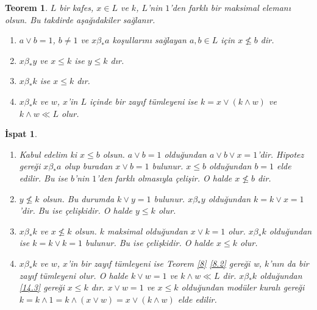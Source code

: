 \documentclass[a4paper,12pt]{article}
\numberwithin{equation}{section}
\theoremstyle{italik}
\newtheorem{teorem}{Teorem}[section]
\newtheorem*{ispat}{İspat}
\begin{document}
\begin{teorem}\label{14}
  $ L $ bir kafes, $ x \in L $ ve $ k $, $ L $'nin $ 1 $'den farklı bir maksimal elemanı olsun. Bu takdirde aşağıdakiler 
  sağlanır. 
  \begin{enumerate}[label=(\roman{*}), ref=(\roman{*})]
    \item $ a \vee b = 1 $, $ b \neq 1 $ ve $ x \beta_* a $ koşullarını sağlayan $ a,b \in L $ için $ x \not\le b $ dir.\label{14.1}
    \item $ x \beta_* y $ ve $ x \leq k $ ise $ y \leq k $ dır.\label{14.2}
    \item $ x \beta_* k $ ise $ x \leq k $ dır.\label{14.3}
    \item $ x \beta_* k $ ve $ w $, $ x $'in $ L $ içinde bir zayıf tümleyeni ise $ k = x \vee ( k \wedge w ) $ 
      ve $ k \wedge w \ll L $ olur.\label{14.4}
  \end{enumerate}
\end{teorem}
\begin{ispat}
  \begin{enumerate}
    \item 
      Kabul edelim ki $ x \leq b $ olsun. $ a \vee b = 1 $ olduğundan $ a \vee b \vee x = 1 $'dir. 
      Hipotez gereği $ x \beta_* a $ olup buradan $ x \vee b = 1 $ bulunur. $ x \leq b $ olduğundan 
      $ b = 1 $ elde edilir. Bu ise $ b $'nin $ 1 $'den farklı olmasıyla çelişir. O halde $ x \not\le b $ dir.
    \item 
      $ y \not\le k $ olsun. Bu durumda $ k \vee y = 1 $ bulunur. $ x \beta_* y $ olduğundan 
      $ k = k \vee x = 1 $'dir. Bu ise çelişkidir. O halde $ y \leq k $ olur.
    \item 
      $ x \beta_* k $ ve $ x \not\le k $ olsun. $ k $ maksimal olduğundan $ x \vee k = 1 $ olur. 
      $ x \beta_* k $ olduğundan ise $ k = k \vee k = 1 $ bulunur. Bu ise çelişkidir. O halde $ x \leq k $ olur.
    \item
      $ x \beta_* k $ ve $ w $, $ x $'in bir zayıf tümleyeni ise Teorem \ref{8} \ref{8.2} gereği 
      w, $ k $'nın da bir zayıf tümleyeni olur. O halde $ k \vee w = 1 $ ve $ k \wedge w \ll L $ dir. 
      $ x \beta_* k $ olduğundan \ref{14.3} gereği $ x \leq k $ dır. 
      $ x \vee w = 1 $ ve $ x \leq k $ olduğundan modüler kuralı gereği $ k = k \wedge 1 = k \wedge ( x \vee w ) = x \vee ( k \wedge w) $ elde edilir. 
  \end{enumerate}
\end{ispat}
\end{document}

